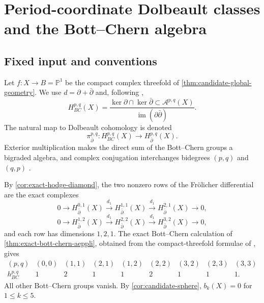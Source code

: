 \section{Period-coordinate Dolbeault classes and the Bott--Chern algebra}
\label{sec:bcpr-product-structure}

\subsection{Fixed input and conventions}

Let $f\colon X\to B=\mathbb P^1$ be the compact complex threefold of
\cref{thm:candidate-global-geometry}.  We use
$d=\partial+\bar\partial$ and, following
\cite[\S1.a]{Schweitzer2007},
\begin{equation}
 H^{p,q}_{BC}(X)=
 \frac{\ker\partial\cap\ker\bar\partial
       \subset\mathcal A^{p,q}(X)}
      {\operatorname{im}(\partial\bar\partial)}.
\label{eq:bcpr-bc-definition}
\end{equation}
The natural map to Dolbeault cohomology is denoted
\begin{equation}
 \pi_{\bar\partial}^{p,q}\colon H^{p,q}_{BC}(X)
 \longrightarrow H^{p,q}_{\bar\partial}(X).
\label{eq:bcpr-dolbeault-map}
\end{equation}
Exterior multiplication makes the direct sum of the Bott--Chern groups a
bigraded algebra, and complex conjugation interchanges bidegrees $(p,q)$
and $(q,p)$ \cite[\S1.a]{Schweitzer2007}.

By \cref{cor:exact-hodge-diamond}, the two nonzero rows of the
Fr\"olicher differential are the exact complexes
\begin{equation}
 0\longrightarrow H^{0,1}_{\bar\partial}(X)
 \xrightarrow{d_1}H^{1,1}_{\bar\partial}(X)
 \xrightarrow{d_1}H^{2,1}_{\bar\partial}(X)
 \longrightarrow0,
\label{eq:bcpr-hodge-row-one}
\end{equation}
\begin{equation}
 0\longrightarrow H^{1,2}_{\bar\partial}(X)
 \xrightarrow{d_1}H^{2,2}_{\bar\partial}(X)
 \xrightarrow{d_1}H^{3,2}_{\bar\partial}(X)
 \longrightarrow0,
\label{eq:bcpr-hodge-row-two}
\end{equation}
and each row has dimensions $1,2,1$.  The exact Bott--Chern calculation
of \cref{thm:exact-bott-chern-aeppli}, obtained from the compact-threefold
formulae of \cite{McHugh2019}, gives
\begin{equation}
\begin{array}{c|cccccccc}
(p,q)&(0,0)&(1,1)&(2,1)&(1,2)&(2,2)&(3,2)&(2,3)&(3,3)\\ \hline
h^{p,q}_{BC}&1&2&1&1&2&1&1&1.
\end{array}
\label{eq:bcpr-nonzero-dimensions}
\end{equation}
All other Bott--Chern groups vanish.  By
\cref{cor:candidate-sphere}, $b_k(X)=0$ for $1\leq k\leq5$.

